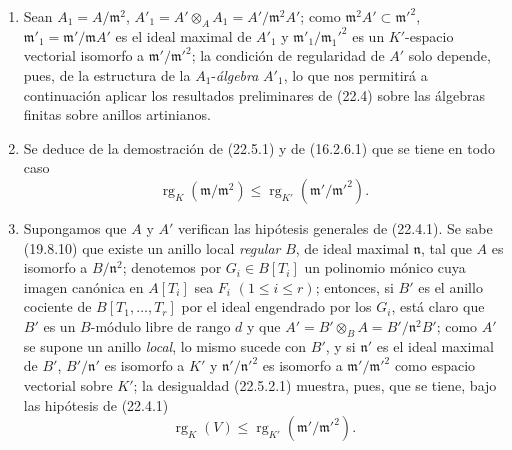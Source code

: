 \begin{remark}[22.5.2]
\label{0.22.5.2-fr}
\begin{enumerate}
  \item[\rm(i)] Sean $A_1=A/\mathfrak m^2$,
  $A'_1=A'\otimes_AA_1=A'/\mathfrak m^2A'$; como
  $\mathfrak m^2A'\subset\mathfrak m'^2$,
  $\mathfrak m'_1=\mathfrak m'/\mathfrak mA'$ es el ideal maximal de $A'_1$
  y $\mathfrak m'_1/\mathfrak m_1'^2$ es un $K'$-espacio vectorial isomorfo
  a $\mathfrak m'/\mathfrak m'^2$; la condición de regularidad de $A'$ solo
  depende, pues, de la estructura de la $A_1$-\emph{álgebra} $A'_1$, lo que nos
  permitirá a continuación aplicar los resultados preliminares de (22.4) sobre
  las álgebras finitas sobre anillos artinianos.
  \item[\rm(ii)] Se deduce de la demostración de (22.5.1) y de (16.2.6.1)
  que se tiene en todo caso
  \begin{equation}
  \label{0.22.5.2.1-fr}
    \operatorname{rg}_K(\mathfrak m/\mathfrak m^2)
    \leqslant\operatorname{rg}_{K'}(\mathfrak m'/\mathfrak m'^2).
    \tag{22.5.2.1}
  \end{equation}


  \item[\rm(iii)] Supongamos que $A$ y $A'$ verifican las hipótesis generales
  de (22.4.1). Se sabe (19.8.10) que existe un anillo local \emph{regular}
  $B$, de ideal maximal $\mathfrak n$, tal que $A$ es isomorfo a
  $B/\mathfrak n^2$; denotemos por $G_i\in B[T_i]$ un polinomio mónico cuya
  imagen canónica en $A[T_i]$ sea $F_i$ $(1\leqslant i\leqslant r)$;
  entonces, si $B'$ es el anillo cociente de $B[T_1,\ldots,T_r]$ por el ideal
  engendrado por los $G_i$, está claro que $B'$ es un $B$-módulo libre de rango
  $d$ y que $A'=B'\otimes_BA=B'/\mathfrak n^2B'$; como $A'$ se supone un
  anillo \emph{local}, lo mismo sucede con $B'$, y si $\mathfrak n'$ es el ideal
  maximal de $B'$, $B'/\mathfrak n'$ es isomorfo a $K'$ y
  $\mathfrak n'/\mathfrak n'^2$ es isomorfo a $\mathfrak m'/\mathfrak m'^2$ como
  espacio vectorial sobre $K'$; la desigualdad (22.5.2.1) muestra, pues, que
  se tiene, bajo las hipótesis de (22.4.1)
  \begin{equation}
  \label{0.22.5.2.2-fr}
    \operatorname{rg}_K(V)\leqslant\operatorname{rg}_{K'}(\mathfrak m'/\mathfrak m'^2).
    \tag{22.5.2.2}
  \end{equation}
\end{enumerate}
\end{remark}

